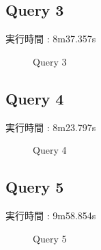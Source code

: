\documentclass[11pt,a4paper]{jsarticle}
\newlength{\subfigwidth}
\newlength{\subfigcolsep}
\begin{document}
\newpage
\subsection{Query 3}
実行時間 : 8m37.357s

\begin{figure}[bthp]
 \setlength{\subfigwidth}{.5\linewidth}
 \addtolength{\subfigwidth}{-.5\subfigcolsep}
 \begin{minipage}[b]{\subfigwidth}
 \end{minipage}
 \begin{minipage}[b]{\subfigwidth}
 \end{minipage}
  \caption{Query 3}
  \label{fig:q3}
\end{figure}

\subsection{Query 4}
実行時間 : 8m23.797s

\begin{figure}[bthp]
 \setlength{\subfigwidth}{.5\linewidth}
 \addtolength{\subfigwidth}{-.5\subfigcolsep}
 \begin{minipage}[b]{\subfigwidth}
 \end{minipage}
 \begin{minipage}[b]{\subfigwidth}
 \end{minipage}
  \caption{Query 4}
  \label{fig:q4}
\end{figure}

\newpage
\subsection{Query 5}
実行時間 : 9m58.854s

\begin{figure}[bthp]
 \setlength{\subfigwidth}{.5\linewidth}
 \addtolength{\subfigwidth}{-.5\subfigcolsep}
 \begin{minipage}[b]{\subfigwidth}
 \end{minipage}
 \begin{minipage}[b]{\subfigwidth}
 \end{minipage}
  \caption{Query 5}
  \label{fig:q5}
\end{figure}
\end{document}

